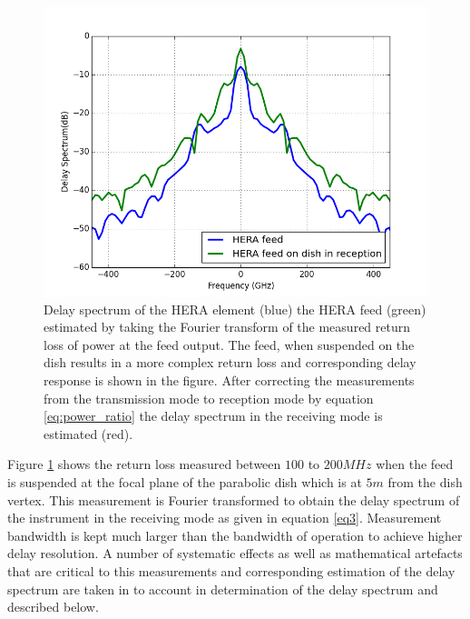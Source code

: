 \documentclass[twocolumn]{emulateapj}
\begin{document}
\begin{figure}[ht]
\label{fig:all_RL}
\end{figure}
\begin{figure}       
\centering
\includegraphics[width=\linewidth]{plots/H_dish_feed.png}
\caption{Delay spectrum of the HERA element (blue) the HERA feed (green) estimated by taking the Fourier transform of the measured return loss of power at the feed output. The feed, when suspended on the dish results in a more complex return loss and corresponding delay response is shown in the figure. After correcting the measurements from the transmission mode to reception mode by equation \ref{eq:power_ratio} the delay spectrum in the receiving mode is estimated (red). }
\label{fig:delay_spectrum}
\end{figure}

Figure \ref{fig:all_RL} shows the return loss measured between $100$ to
$200MHz$ when the feed is suspended at the focal plane of the parabolic dish which is at $5m$ from the dish vertex. This measurement is Fourier transformed to obtain the delay spectrum of the instrument in the receiving mode as given in equation \ref{eq3}. Measurement bandwidth is kept much larger than the bandwidth of operation to achieve higher delay resolution. A number of systematic effects as well as mathematical artefacts that are critical to this measurements and corresponding estimation of the delay spectrum are taken in to account in determination of the delay spectrum and described below. 
\end{document}
